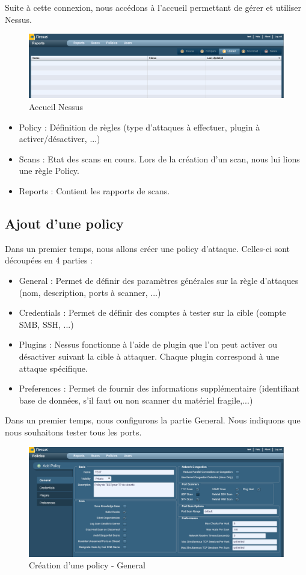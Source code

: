 \documentclass[a4paper,12pt]{article}
\begin{document}
Suite à cette connexion, nous accédons à l'accueil permettant de gérer et utiliser Nessus.

\begin{figure}[H]
	\center
	\includegraphics[width=15cm]{img/nessus_accueil.png}
	\caption{Accueil Nessus}
\end{figure}

\begin{itemize}
	\item Policy : Définition de règles (type d'attaques à effectuer, plugin à activer/désactiver, ...)
	\item Scans : Etat des scans en cours. Lors de la création d'un scan, nous lui lions une règle Policy.
	\item Reports : Contient les rapports de scans.
\end{itemize}

\subsection{Ajout d'une policy}
Dans un premier temps, nous allons créer une policy d'attaque. Celles-ci sont découpées en 4 parties :
\begin{itemize}
	\item General : Permet de définir des paramètres générales sur la règle d'attaques (nom, description, ports à scanner, ...)
	\item Credentials : Permet de définir des comptes à tester sur la cible (compte SMB, SSH, ...)
	\item Plugins : Nessus fonctionne à l'aide de plugin que l'on peut activer ou désactiver suivant la cible à attaquer. Chaque plugin correspond à une
	attaque spécifique.
	\item Preferences : Permet de fournir des informations supplémentaire (identifiant base de données, s'il faut ou non scanner du matériel fragile,...) 
\end{itemize}

Dans un premier temps, nous configurons la partie General. Nous indiquons que nous souhaitons tester tous les ports.
\begin{figure}[H]
	\center
	\includegraphics[width=15cm]{img/nessus_policy_general.png}
	\caption{Création d'une policy - General}
\end{figure}
\end{document}
